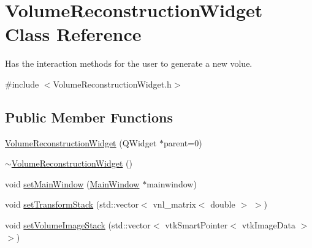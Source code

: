 \hypertarget{class_volume_reconstruction_widget}{\section{Volume\-Reconstruction\-Widget Class Reference}
\label{d5/d55/class_volume_reconstruction_widget}
}


Has the interaction methods for the user to generate a new volue.  




{\ttfamily \#include $<$Volume\-Reconstruction\-Widget.\-h$>$}

\subsection*{Public Member Functions}
\begin{DoxyCompactItemize}
\item 
\hyperlink{class_volume_reconstruction_widget_a416775ea7aaf4825ac221175748d4a44}{Volume\-Reconstruction\-Widget} (Q\-Widget $\ast$parent=0)
\item 
\hyperlink{class_volume_reconstruction_widget_a3405f6a602f58f56a00eb3931832c244}{$\sim$\-Volume\-Reconstruction\-Widget} ()
\item 
void \hyperlink{class_volume_reconstruction_widget_af052a30a68972c3d864268afdf4a9b01}{set\-Main\-Window} (\hyperlink{class_main_window}{Main\-Window} $\ast$mainwindow)
\item 
void \hyperlink{class_volume_reconstruction_widget_a4a6309c14e9dc0b56a4d2e5037f6ded7}{set\-Transform\-Stack} (std\-::vector$<$ vnl\-\_\-matrix$<$ double $>$ $>$)
\item 
void \hyperlink{class_volume_reconstruction_widget_a748ad3f117a04950da1e46eda4d5f763}{set\-Volume\-Image\-Stack} (std\-::vector$<$ vtk\-Smart\-Pointer$<$ vtk\-Image\-Data $>$ $>$)
\end{DoxyCompactItemize}
